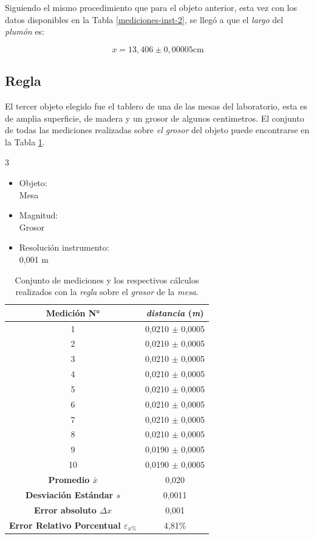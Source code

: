 \documentclass[12pt,a4paper]{article}
\begin{document}
Siguiendo el mismo procedimiento que para el objeto anterior, esta vez con los datos disponibles en la Tabla \ref{mediciones-inst-2}, se llegó a que el \textit{largo} del \textit{plumón} es:

\begin{equation*}
x = 13,406 \pm 0,00005 \textrm{cm}
\end{equation*}

\subsection{Regla}

El tercer objeto elegido fue el tablero de una de las mesas del laboratorio, esta es de amplia superficie, de madera y un grosor de algunos centimetros. El conjunto de todas las mediciones realizadas sobre \textit{el grosor} del objeto puede encontrarse en la Tabla \ref{mediciones-inst-3}.

\begin{multicols}{3}
\begin{itemize}
    \item Objeto: \\ Mesa
    \item Magnitud: \\ Grosor
    \item Resolución instrumento: \\ 0,001 m
\end{itemize}
\end{multicols}

\begin{table}[h!]
\centering
\begin{tabular}{|c|c|}
\hline
\textbf{Medición N°} & \textit{distancia} \textbf{(}\textit{m}\textbf{)} \\ \hline
1 & 0,0210 $\pm$ 0,0005 \\ \hline
2 & 0,0210 $\pm$ 0,0005 \\ \hline
3 & 0,0210 $\pm$ 0,0005 \\ \hline
4 & 0,0210 $\pm$ 0,0005 \\ \hline
5 & 0,0210 $\pm$ 0,0005 \\ \hline
6 & 0,0210 $\pm$ 0,0005 \\ \hline
7 & 0,0210 $\pm$ 0,0005 \\ \hline
8 & 0,0210 $\pm$ 0,0005 \\ \hline
9 & 0,0190 $\pm$ 0,0005 \\ \hline
10 & 0,0190 $\pm$ 0,0005 \\ \hline
\textbf{Promedio $\bar{x}$} & 0,020 \\ \hline
\textbf{Desviación Estándar $s$} & 0,0011 \\ \hline
\textbf{Error absoluto $\Delta x$} & 0,001 \\ \hline
\textbf{Error Relativo Porcentual $\varepsilon_{x\%}$} &  4,81\% \\ \hline
\end{tabular}
\caption{Conjunto de mediciones y los respectivos cálculos realizados con la \textit{regla} sobre el \textit{grosor} de la \textit{mesa}.}
\label{mediciones-inst-3}
\end{table}
\end{document}
